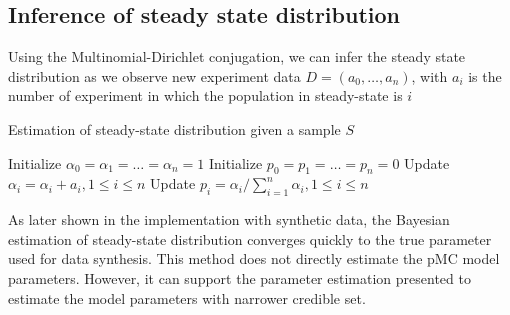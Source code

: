 \documentclass[12pt]{article}
\theoremstyle{definition}
\begin{document}
\subsection{Inference of steady state distribution}
Using the Multinomial-Dirichlet conjugation, we can infer the steady state
distribution as we observe new experiment data $D=(a_0,\ldots,a_n)$, with $a_i$
is the number of experiment in which the population in steady-state is $i$ 
\begin{algorithm}[H]
  \caption{Estimation of steady-state distribution given a sample $S$}\label{exp_a}
  \begin{algorithmic}[1]
    \State Initialize $\alpha_0=\alpha_1=\ldots=\alpha_n=1$
    \State Initialize $p_0=p_1=\ldots=p_n=0$
    \State Update $\alpha_i = \alpha_i + a_i, 1 \leq i \leq n$
    \State Update $p_i = \alpha_i / \sum_{i=1}^n \alpha_i, 1 \leq i \leq n$
    \EndProcedure
  \end{algorithmic}
\end{algorithm}

As later shown in the implementation with synthetic data, the Bayesian
estimation of steady-state distribution converges quickly to the true parameter
used for data synthesis. This method does not directly estimate the pMC
model parameters. However, it can support the parameter estimation presented
\cite{hajnal2019data} to estimate the model parameters with narrower credible
set.
\end{document}
